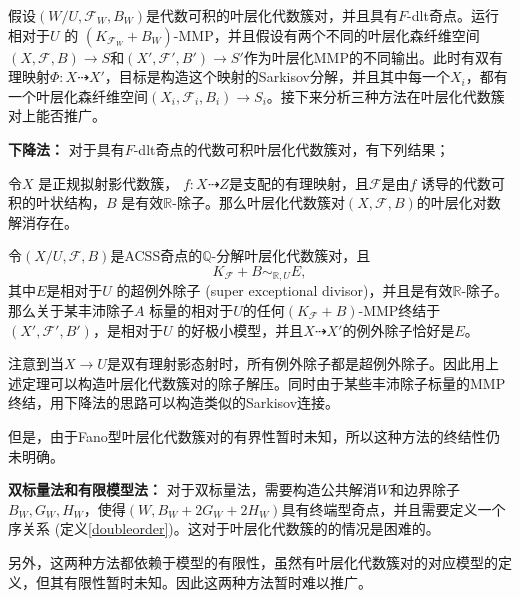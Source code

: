 假设$(W/U,\mathcal{F}_{W},B_{W})$是代数可积的叶层化代数簇对，并且具有$F$-dlt奇点。运行相对于$U$ 的 $(K_{\mathcal{F}_{W}}+B_{W})$-MMP，并且假设有两个不同的叶层化森纤维空间$(X,\mathcal{F},B)\to S$和$(X',\mathcal{F}',B')\to S'$作为叶层化MMP的不同输出。此时有双有理映射$\Phi:X \dashrightarrow X'$，目标是构造这个映射的Sarkisov分解，并且其中每一个$X_{i}$，都有一个叶层化森纤维空间$(X_{i},\mathcal{F}_{i},B_{i})\to S_{i}$。接下来分析三种方法在叶层化代数簇对上能否推广。

\textbf{下降法：}
对于具有$F$-dlt奇点的代数可积叶层化代数簇对，有下列结果；
\begin{lemma}\cite[Lemma 6.2.4]{chlx}
  令$X$ 是正规拟射影代数簇， $f:X \dashrightarrow Z$是支配的有理映射，且$\mathcal{F}$是由$f$ 诱导的代数可积的叶状结构，$B$ 是有效$\mathbb{R}$-除子。那么叶层化代数簇对$(X,\mathcal{F},B)$的叶层化对数解消存在。
\end{lemma}
\begin{theorem}[压缩超例外除子]\cite[Theorem 9.4.1]{chlx}
 令$(X/U,\mathcal{F},B)$是ACSS奇点的$\mathbb{Q}$-分解叶层化代数簇对，且
 \[ K_{\mathcal{F}}+B \sim_{\mathbb{R},U}E ,\]
其中$E$是相对于$U$ 的超例外除子 (super exceptional divisor)，并且是有效$\mathbb{R}$-除子。那么关于某丰沛除子$A$ 标量的相对于$U$的任何$(K_{\mathcal{F}}+B)$-MMP终结于$(X',\mathcal{F}',B')$，是相对于$U$ 的好极小模型，并且$X \dashrightarrow X' $的例外除子恰好是$E$。 
\end{theorem}
注意到当$X\to U$是双有理射影态射时，所有例外除子都是超例外除子。因此用上述定理可以构造叶层化代数簇对的除子解压。同时由于某些丰沛除子标量的MMP终结，用下降法的思路可以构造类似的Sarkisov连接。

但是，由于Fano型叶层化代数簇对的有界性暂时未知，所以这种方法的终结性仍未明确。

\textbf{双标量法和有限模型法：}
对于双标量法，需要构造公共解消$W$和边界除子$B_{W},G_{W},H_{W}$，使得$(W,B_{W}+2G_{W}+2H_{W})$具有终端型奇点，并且需要定义一个序关系 (定义\ref{doubleorder})。这对于叶层化代数簇的的情况是困难的。

另外，这两种方法都依赖于模型的有限性，虽然有叶层化代数簇对的对应模型的定义，但其有限性暂时未知。因此这两种方法暂时难以推广。
